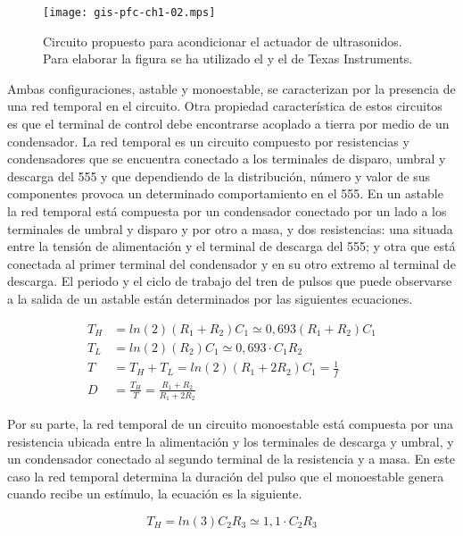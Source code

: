 \begin{sidewaysfigure}
	\begin{center}
		\texttt{[image: gis-pfc-ch1-02.mps]}
	\end{center}
	\caption[Circuito acondicionador de la sección de emisión]{Circuito
	propuesto para acondicionar el actuador de ultrasonidos. Para
	elaborar la figura se ha utilizado el  y el 
	de Texas Instruments.}
	\label{fig:txconditioner}
\end{sidewaysfigure}

Ambas configuraciones, astable y monoestable, se caracterizan por la
presencia de una red temporal en el circuito. Otra propiedad característica
de estos circuitos es que el terminal de control debe encontrarse acoplado
a tierra por medio de un condensador. La red temporal es un circuito
compuesto por resistencias y condensadores que se encuentra conectado a los
terminales de disparo, umbral y descarga del 555 y que dependiendo de la
distribución, número y valor de sus componentes provoca un determinado
comportamiento en el 555. En un astable la red temporal está compuesta por
un condensador conectado por un lado a los terminales de umbral y disparo y
por otro a masa, y dos resistencias: una situada entre la tensión de
alimentación y el terminal de descarga del 555; y otra que está conectada
al primer terminal del condensador y en su otro extremo al terminal de
descarga. El periodo y el ciclo de trabajo del tren de pulsos que puede
observarse a la salida de un astable están determinados por las siguientes
ecuaciones.

\begin{align}
	T_H &= ln(2)(R_1 + R_2)C_1 \simeq 0,693(R_1 + R_2)C_1 \\
	T_L &= ln(2)(R_2)C_1 \simeq 0,693\cdot C_1R_2 \\
	T &= T_H + T_L = ln(2)(R_1 + 2R_2)C_1 = \frac{1}{f} \\
	D &= \frac{T_H}{T} = \frac{R_1 + R_2}{R_1 + 2R_2}
	\label{eq:astable}
\end{align}

Por su parte, la red temporal de un circuito monoestable está compuesta por
una resistencia ubicada entre la alimentación y los terminales de descarga
y umbral, y un condensador conectado al segundo terminal de la resistencia
y a masa. En este caso la red temporal determina la duración del pulso que
el monoestable genera cuando recibe un estímulo, la ecuación es la
siguiente.

\begin{equation}
	T_H = ln(3)C_2R_3 \simeq 1,1\cdot C_2R_3
	\label{eq:monostable}
\end{equation}

